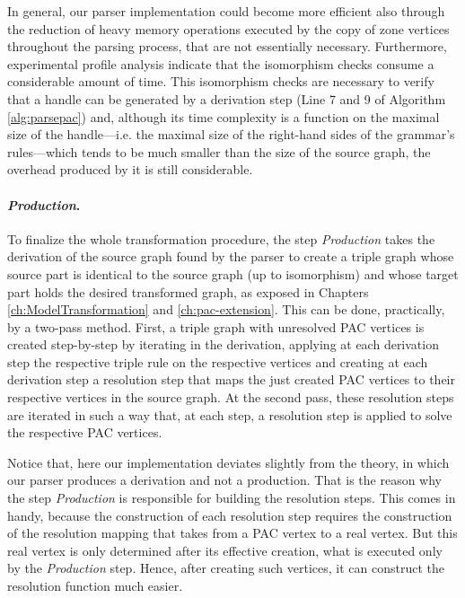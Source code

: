 In general, our parser implementation could become more efficient also through the reduction of heavy memory operations executed by the copy of zone vertices throughout the parsing process, that are not essentially necessary. Furthermore, experimental profile analysis indicate that the isomorphism checks consume a considerable amount of time. This isomorphism checks are necessary to verify that a handle can be generated by a derivation step (Line 7 and 9 of Algorithm \ref{alg:parsepac}) and, although its time complexity is a function on the maximal size of the handle---i.e. the maximal size of the right-hand sides of the grammar's rules---which tends to be much smaller than the size of the source graph, the overhead produced by it is still considerable. 

\paragraph*{\emph{Production}.} To finalize the whole transformation procedure, the step \emph{Production} takes the derivation of the source graph found by the parser to create a triple graph whose source part is identical to the source graph (up to isomorphism) and whose target part holds the desired transformed graph, as exposed in Chapters \ref{ch:ModelTransformation} and \ref{ch:pac-extension}. This can be done, practically, by a two-pass method. First, a triple graph with unresolved PAC vertices is created step-by-step by iterating in the derivation, applying at each derivation step the respective triple rule on the respective vertices and creating at each derivation step a resolution step that maps the just created PAC vertices to their respective vertices in the source graph. At the second pass, these resolution steps are iterated in such a way that, at each step, a resolution step is applied to solve the respective PAC vertices.

Notice that, here our implementation deviates slightly from the theory, in which our parser produces a derivation and not a production. That is the reason why the step \emph{Production} is responsible for building the resolution steps. This comes in handy, because the construction of each resolution step requires the construction of the resolution mapping that takes from a PAC vertex to a real vertex. But this real vertex is only determined after its effective creation, what is executed only by the \emph{Production} step. Hence, after creating such vertices, it can construct the resolution function much easier.

